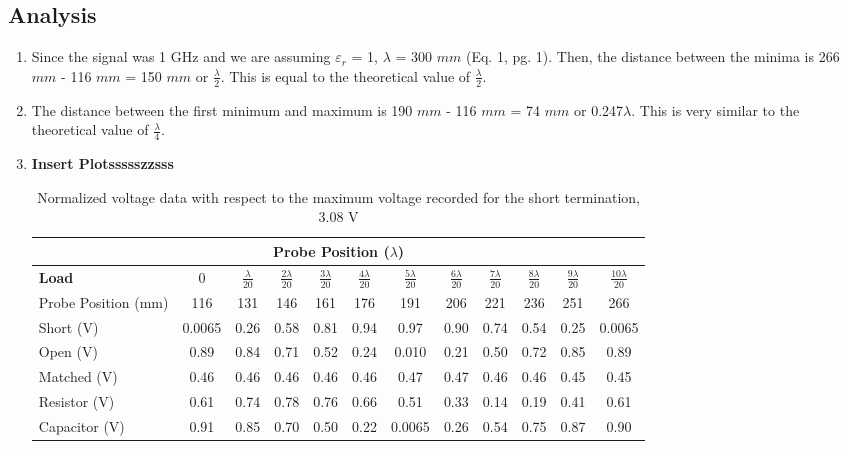 \documentclass{article}
\begin{document}
\subsection{Analysis}
\begin{enumerate}
	\item Since the signal was 1 GHz and we are assuming $\varepsilon_r$ = 1, $\lambda$ = 300 $mm$ (Eq. 1, pg. 1). Then, the distance between the minima is 266 $mm$ - 116 $mm$ = 150 $mm$ or $\frac{\lambda}{2}$. This is equal to the theoretical value of $\frac{\lambda}{2}$.
	
	\item The distance between the first minimum and maximum is 190 $mm$ - 116 $mm$ = 74 $mm$ or 0.247$\lambda$. This is very similar to the theoretical value of $\frac{\lambda}{4}$.
	
	\item \textbf{Insert Plotssssszzsss}
	\begin{table}[h]
	\centering
		\begin{tabular}{|l|c|c|c|c|c|c|c|c|c|c|c|}
		\hline
		\multicolumn{12}{|c|}{\textbf{Probe Position ($\lambda$)}}                                                         		\\ \hline
		\textbf{Load}       & 0      & $\frac{\lambda}{20}$    & $\frac{2\lambda}{20}$    & $\frac{3\lambda}{20}$    & $\frac{4\lambda}{20}$    & $\frac{5\lambda}{20}$      & $\frac{6\lambda}{20}$    & $\frac{7\lambda}{20}$    & $\frac{8\lambda}{20}$    & $\frac{9\lambda}{20}$    & $\frac{10\lambda}{20}$     		\\ \hline
		Probe Position (mm) & 116    & 131  & 146  & 161  & 176  & 191    & 206  & 221  & 236  & 251  & 266    		\\ \hline
		Short (V)           & 0.0065 & 0.26 & 0.58 & 0.81 & 0.94 & 0.97   & 0.90 & 0.74 & 0.54 & 0.25 & 0.0065 		\\ \hline
		Open (V)            & 0.89   & 0.84 & 0.71 & 0.52 & 0.24 & 0.010  & 0.21 & 0.50 & 0.72 & 0.85 & 0.89   		\\ \hline
		Matched (V)         & 0.46   & 0.46 & 0.46 & 0.46 & 0.46 & 0.47   & 0.47 & 0.46 & 0.46 & 0.45 & 0.45   		\\ \hline
		Resistor (V)        & 0.61   & 0.74 & 0.78 & 0.76 & 0.66 & 0.51   & 0.33 & 0.14 & 0.19 & 0.41 & 0.61   		\\ \hline
		Capacitor (V)       & 0.91   & 0.85 & 0.70 & 0.50 & 0.22 & 0.0065 & 0.26 & 0.54 & 0.75 & 0.87 & 0.90   		\\ \hline
		\end{tabular}
		\caption{Normalized voltage data with respect to the maximum voltage recorded for the short termination, 3.08 V}
		\label{}
	\end{table}
\end{enumerate}
\end{document}
